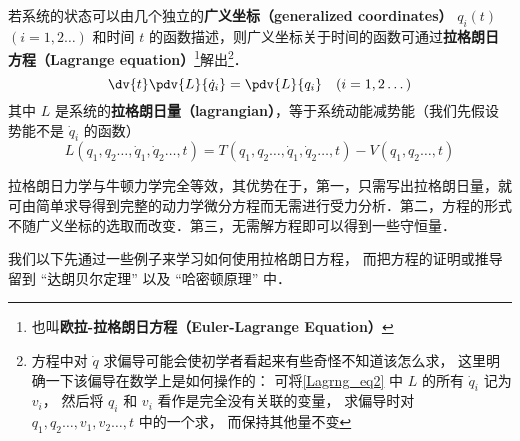 

若系统的状态可以由几个独立的\textbf{广义坐标（generalized coordinates）} $q_i(t)$ $(i=1,2\dots)$ 和时间 $t$ 的函数描述，则广义坐标关于时间的函数可通过\textbf{拉格朗日方程（Lagrange equation）}\footnote{也叫\textbf{欧拉-拉格朗日方程（Euler-Lagrange Equation）}}解出\footnote{方程中对 $\dot q$ 求偏导可能会使初学者看起来有些奇怪不知道该怎么求， 这里明确一下该偏导在数学上是如何操作的： 可将\autoref{Lagrng_eq2} 中 $L$ 的所有 $\dot q_i$ 记为 $v_i$， 然后将 $q_i$ 和 $v_i$ 看作是完全没有关联的变量， 求偏导时对 $q_1,q_2\dots, v_1, v_2\dots,t$ 中的一个求， 而保持其他量不变}．
\begin{equation}\label{Lagrng_eq1}
\dv{t} \pdv{L}{\dot q_i} = \pdv{L}{q_i}
\quad (i=1,2\dots)
\end{equation}
其中 $L$ 是系统的\textbf{拉格朗日量（lagrangian）}，等于系统动能减势能（我们先假设势能不是 $\dot q_i$ 的函数）
\begin{equation}\label{Lagrng_eq2}
L(q_1,q_2\dots,\dot q_1,\dot q_2\dots,t) = T(q_1,q_2\dots,\dot q_1,\dot q_2\dots,t) - V(q_1,q_2\dots, t)
\end{equation}


拉格朗日力学与牛顿力学完全等效，其优势在于，第一，只需写出拉格朗日量，就可由简单求导得到完整的动力学微分方程而无需进行受力分析．第二，方程的形式不随广义坐标的选取而改变．第三，无需解方程即可以得到一些守恒量．

我们以下先通过一些例子来学习如何使用拉格朗日方程， 而把方程的证明或推导留到 “达朗贝尔定理” 以及 “哈密顿原理” 中．

